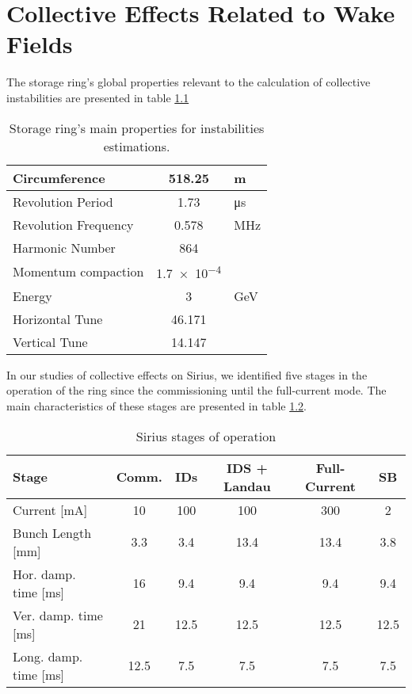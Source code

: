 \chapter{Collective Effects Related to Wake Fields}

The storage ring's global properties relevant to the calculation of collective instabilities are presented in table \ref{tab:sr_main_properties}

\begin{table}[!ht]
 \centering
 \caption{Storage ring's main properties for instabilities estimations.}
 \label{tab:sr_main_properties}
 \begin{tabular}{lcl}
  Circumference & 518.25 & \si{\meter}\\\hline
  Revolution Period & 1.73 & \si{\micro\second}\\\hline
  Revolution Frequency & 0.578 & \si{\mega\hertz}\\\hline
  Harmonic Number      & 864   & \\\hline
  Momentum compaction  & \SI{1.7e-4}{}\\\hline
  Energy               & 3      & \si{\giga\electronvolt}\\\hline
  Horizontal Tune      & 46.171 & \\\hline
  Vertical Tune        & 14.147 & \\\hline
 \end{tabular}
\end{table}

In our studies of collective effects on Sirius, we identified five stages in the operation of the ring since the commissioning until the full-current mode. The main characteristics of these stages are presented in table \ref{tab:sirius_stages}.

\begin{table}[!hb]
 \centering
 \caption{Sirius stages of operation}
 \label{tab:sirius_stages}
 \begin{tabular}{lccccc}
 Stage  & Comm.  & IDs  & IDS + Landau & Full-Current & SB \\\hline
 Current [\si{\milli\ampere}] & 10     & 100  &  100        & 300  & 2    \\\hline
 Bunch Length [\si{\milli\meter}] & 3.3 & 3.4 &  13.4       & 13.4 & 3.8    \\\hline
 Hor. damp. time [\si{\milli\second}]  & 16  & 9.4 &  9.4   & 9.4  &9.4 \\\hline
 Ver. damp. time [\si{\milli\second}]  & 21  & 12.5&  12.5  & 12.5 &12.5   \\\hline
 Long. damp. time [\si{\milli\second}] & 12.5& 7.5 &  7.5   & 7.5  &7.5  \\\hline
 \end{tabular}
\end{table}

